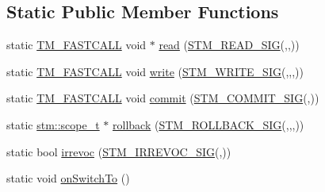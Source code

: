 \subsection*{Static Public Member Functions}
\begin{DoxyCompactItemize}
\item 
static \hyperlink{platform_8hpp_a8b5d728e6eed8f368f9966f637d2f719}{T\-M\-\_\-\-F\-A\-S\-T\-C\-A\-L\-L} void $\ast$ \hyperlink{structanonymous__namespace_02cgl_8cpp_03_1_1CGL_a593fb3efb22e626eeac92dacddffe1b3}{read} (\hyperlink{include_2stm_2macros_8hpp_abae784c2079f9c1ecc6a72cfeb795db4}{S\-T\-M\-\_\-\-R\-E\-A\-D\-\_\-\-S\-I\-G}(,,))
\item 
static \hyperlink{platform_8hpp_a8b5d728e6eed8f368f9966f637d2f719}{T\-M\-\_\-\-F\-A\-S\-T\-C\-A\-L\-L} void \hyperlink{structanonymous__namespace_02cgl_8cpp_03_1_1CGL_a8cc76c32619dacd9ffde6cb59bfe5bea}{write} (\hyperlink{include_2stm_2macros_8hpp_a05836a7c31fa89c1c84557f4691c44d3}{S\-T\-M\-\_\-\-W\-R\-I\-T\-E\-\_\-\-S\-I\-G}(,,,))
\item 
static \hyperlink{platform_8hpp_a8b5d728e6eed8f368f9966f637d2f719}{T\-M\-\_\-\-F\-A\-S\-T\-C\-A\-L\-L} void \hyperlink{structanonymous__namespace_02cgl_8cpp_03_1_1CGL_afa774fba753d8479c3042537c2980f52}{commit} (\hyperlink{include_2stm_2macros_8hpp_a1b8304eb1082517c7dc31f3534b72343}{S\-T\-M\-\_\-\-C\-O\-M\-M\-I\-T\-\_\-\-S\-I\-G}(,))
\item 
static \hyperlink{namespacestm_a91badf88c88aacc831b01a315435a255}{stm\-::scope\-\_\-t} $\ast$ \hyperlink{structanonymous__namespace_02cgl_8cpp_03_1_1CGL_a4dc35056cb2252ac9ceaac5e61ca4fb1}{rollback} (\hyperlink{include_2stm_2macros_8hpp_a1c36a48149c84f90d5bca01019950ca9}{S\-T\-M\-\_\-\-R\-O\-L\-L\-B\-A\-C\-K\-\_\-\-S\-I\-G}(,,,))
\item 
static bool \hyperlink{structanonymous__namespace_02cgl_8cpp_03_1_1CGL_a6b8f55a3730ebbb35854441b9e1c7102}{irrevoc} (\hyperlink{include_2stm_2macros_8hpp_acf117c2df6442342f6603e1a12fa3b5c}{S\-T\-M\-\_\-\-I\-R\-R\-E\-V\-O\-C\-\_\-\-S\-I\-G}(,))
\item 
static void \hyperlink{structanonymous__namespace_02cgl_8cpp_03_1_1CGL_ac484f415f51b7fa06a14495b420f5050}{on\-Switch\-To} ()
\end{DoxyCompactItemize}


